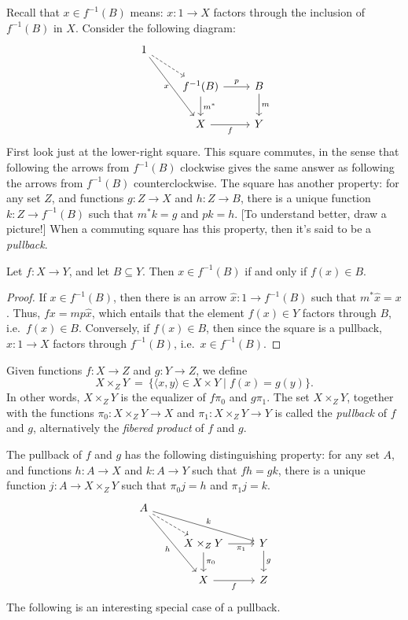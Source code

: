 Recall that $x\in f^{-1}(B)$ means: $x:1\to X$ factors
  through the inclusion of $f^{-1}(B)$ in $X$.  Consider the following
  diagram:
\[ \begin{tikzcd}
  1 \arrow{ddr}[left]{x} \arrow[dashed]{dr} \\
  & f^{-1}(B) \arrow{r}{p} \arrow{d}{m^*} & B \arrow{d}[right]{m} \\
  & X \arrow{r}[below]{f} & Y \end{tikzcd} \] First look just at the
lower-right square.  This square commutes, in the sense that following
the arrows from $f^{-1}(B)$ clockwise gives the same answer as
following the arrows from $f^{-1}(B)$ counterclockwise.  The square
has another property: for any set $Z$, and functions $g:Z\to X$ and
$h:Z\to B$, there is a unique function $k:Z\to f^{-1}(B)$ such that
$m^{*}k=g$ and $pk=h$.  [To understand better, draw a picture!]  When
a commuting square has this property, then it's said to be a
\emph{pullback}.

\begin{prop} Let $f:X\to Y$, and let $B\subseteq Y$.  Then $x\in
  f^{-1}(B)$ if and only if $f(x)\in B$.  \end{prop}

\begin{proof} If $x\in f^{-1}(B)$, then there is an arrow
  $\hat{x}:1\to f^{-1}(B)$ such that $m^*\hat{x}=x$.  Thus,
  $fx=mp\hat{x}$, which entails that the element $f(x)\in Y$ factors
  through $B$, i.e.\ $f(x)\in B$.  Conversely, if $f(x)\in B$, then
  since the square is a pullback, $x:1\to X$ factors through
  $f^{-1}(B)$, i.e.\ $x\in f^{-1}(B)$. \end{proof}

\begin{defn} Given functions $f:X\to Z$ and $g:Y\to Z$, we define
  \[ X\times _ZY \: = \: \{ \langle x,y\rangle \in X\times Y \mid
  f(x)=g(y) \} .\] In other words, $X\times _ZY$ is the equalizer of
  $f\pi _0$ and $g\pi _1$.  The set $X\times _ZY$, together with the
  functions $\pi _0:X\times _ZY\to X$ and $\pi _1:X\times _ZY\to Y$ is
  called the \emph{pullback} of $f$ and $g$, alternatively the
  \emph{fibered product} of $f$ and $g$.   \end{defn}

The pullback of $f$ and $g$ has the following distinguishing property:
for any set $A$, and functions $h:A\to X$ and $k:A\to Y$ such that
$fh=gk$, there is a unique function $j:A\to X\times _ZY$ such that
$\pi _0j=h$ and $\pi _1j=k$.
\[ \begin{tikzcd}
  A \arrow[ddr,"h"'] \arrow[drr,"k"] \arrow[dr,dashed] \\
  & X\times _ZY \arrow[d,"\pi _0"] \arrow[r,"\pi _1"'] & Y
  \arrow[d,"g"]
  \\
  & X \arrow[r,"f"'] & Z \end{tikzcd} \] The following is an
interesting special case of a pullback.

